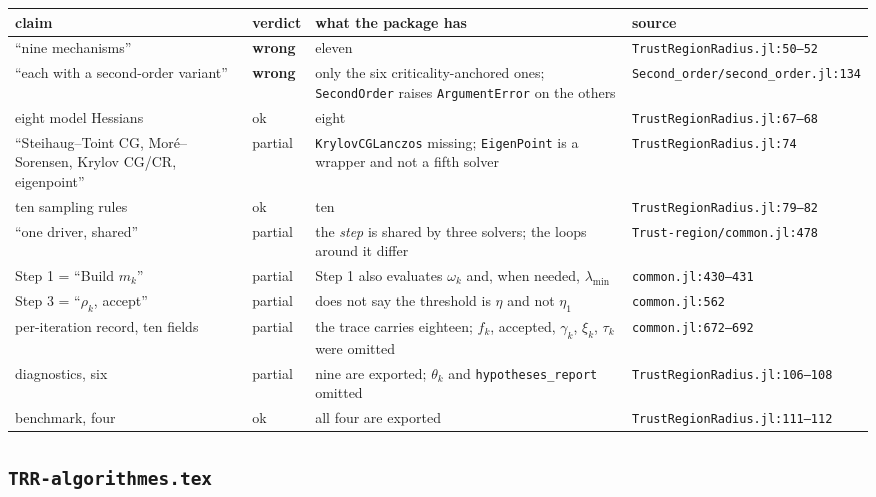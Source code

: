 \documentclass[11pt,a4paper]{article}
\newcommand{\WRONG}{\textcolor{red!70!black}{\textbf{wrong}}}
\newcommand{\PART}{\textcolor{black!60}{partial}}
\begin{document}
\begin{longtable}{p{} p{} p{} p{}}
  \toprule
  claim & verdict & what the package has & source \\
  \midrule
  \endhead
  ``nine mechanisms'' & \WRONG & eleven & \texttt{TrustRegionRadius.jl:50--52} \\
  ``each with a second-order variant'' & \WRONG
    & only the six criticality-anchored ones; \texttt{SecondOrder} raises
      \texttt{ArgumentError} on the others
    & \texttt{Second\_order/second\_order.jl:134} \\
  eight model Hessians & ok & eight & \texttt{TrustRegionRadius.jl:67--68} \\
  ``Steihaug--Toint CG, Mor\'e--Sorensen, Krylov CG/CR, eigenpoint'' & \PART
    & \texttt{KrylovCGLanczos} missing; \texttt{EigenPoint} is a wrapper and not
      a fifth solver
    & \texttt{TrustRegionRadius.jl:74} \\
  ten sampling rules & ok & ten & \texttt{TrustRegionRadius.jl:79--82} \\
  ``one driver, shared'' & \PART
    & the \emph{step} is shared by three solvers; the loops around it differ
    & \texttt{Trust-region/common.jl:478} \\
  Step 1 = ``Build $m_k$'' & \PART
    & Step 1 also evaluates $\omega_k$ and, when needed, $\lambda_{\min}$
    & \texttt{common.jl:430--431} \\
  Step 3 = ``$\rho_k$, accept'' & \PART
    & does not say the threshold is $\eta$ and not $\eta_1$
    & \texttt{common.jl:562} \\
  per-iteration record, ten fields & \PART
    & the trace carries eighteen; $f_k$, accepted, $\gamma_k$, $\xi_k$, $\tau_k$
      were omitted
    & \texttt{common.jl:672--692} \\
  diagnostics, six & \PART
    & nine are exported; $\theta_k$ and \texttt{hypotheses\_report} omitted
    & \texttt{TrustRegionRadius.jl:106--108} \\
  benchmark, four & ok & all four are exported
    & \texttt{TrustRegionRadius.jl:111--112} \\
  \bottomrule
\end{longtable}

\subsection{\texttt{TRR-algorithmes.tex}}
\end{document}

